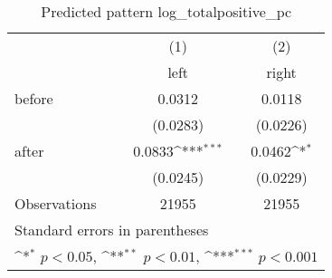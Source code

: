\begin{table}[htbp]\centering
\def\sym#1{\ifmmode^{#1}\else\(^{#1}\)\fi}
\caption{Predicted pattern log\_totalpositive\_pc}
\begin{tabular}{l*{2}{c}}
\hline\hline
                    &\multicolumn{1}{c}{(1)}&\multicolumn{1}{c}{(2)}\\
                    &\multicolumn{1}{c}{left}&\multicolumn{1}{c}{right}\\
\hline
before              &      0.0312         &      0.0118         \\
                    &    (0.0283)         &    (0.0226)         \\
[1em]
after               &      0.0833\sym{***}&      0.0462\sym{*}  \\
                    &    (0.0245)         &    (0.0229)         \\
\hline
Observations        &       21955         &       21955         \\
\hline\hline
\multicolumn{3}{l}{\footnotesize Standard errors in parentheses}\\
\multicolumn{3}{l}{\footnotesize \sym{*} \(p<0.05\), \sym{**} \(p<0.01\), \sym{***} \(p<0.001\)}\\
\end{tabular}
\end{table}
